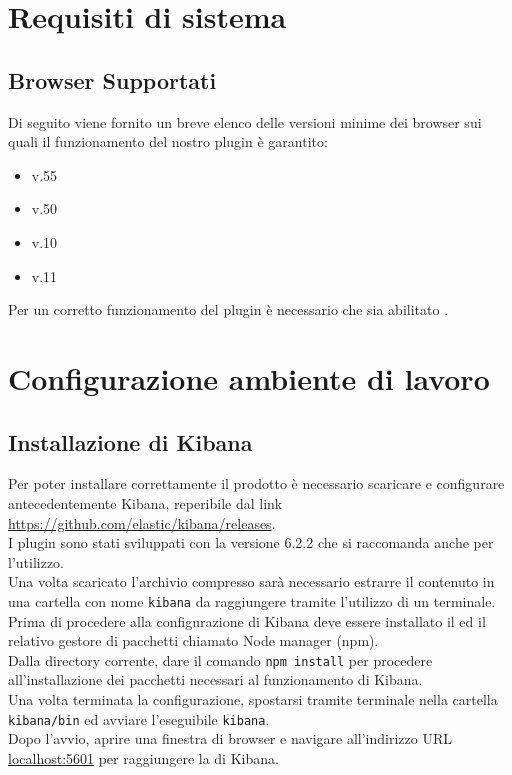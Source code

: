 \section{Requisiti di sistema}
\subsection{Browser Supportati}

Di seguito viene fornito un breve elenco delle versioni minime dei browser sui quali il funzionamento del nostro plugin è garantito:
\begin{itemize}
	
	\item {} v.55
	\item {} v.50
	\item {} v.10
	\item {} v.11
	
\end{itemize}

Per un corretto funzionamento del plugin è necessario che sia abilitato .




\section{Configurazione ambiente di lavoro}
\label{sec:configurazione}
\subsection{Installazione di Kibana}
Per poter installare correttamente il prodotto è necessario scaricare e configurare antecedentemente Kibana, reperibile dal link  \url{https://github.com/elastic/kibana/releases}.\\
I plugin sono stati sviluppati con la versione 6.2.2 che si raccomanda anche per l'utilizzo.\\
Una volta scaricato l'archivio compresso sarà necessario estrarre il contenuto in una cartella con nome \texttt{kibana} da raggiungere tramite l'utilizzo di un terminale.
Prima di procedere alla configurazione di Kibana deve essere installato il   ed il relativo gestore di pacchetti chiamato Node  manager (npm).\\
Dalla directory corrente, dare il comando \texttt{npm install} per procedere all'installazione dei pacchetti necessari al funzionamento di Kibana.\\
Una volta terminata la configurazione, spostarsi tramite terminale nella cartella \texttt{kibana/bin} ed avviare l'eseguibile \texttt{kibana}.\\
Dopo l'avvio, aprire una finestra di browser e navigare all'indirizzo URL \url{localhost:5601} per raggiungere la  di Kibana.

